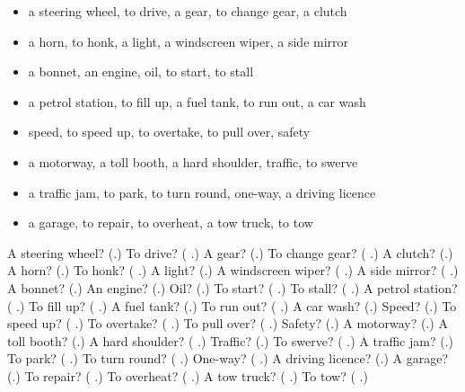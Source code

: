 \begin{itemize}
\raggedright
  \item a steering wheel, to drive, a gear, to change gear, a clutch
  \item a horn, to honk, a light, a windscreen wiper, a side mirror
  \item a bonnet, an engine, oil, to start, to stall
  \item a petrol station, to fill up, a fuel tank, to run out, a car wash
  \item speed, to speed up, to overtake, to pull over, safety
  \item a motorway, a toll booth, a hard shoulder, traffic, to swerve
  \item a traffic jam, to park, to turn round, one-way, a driving licence
  \item a garage, to repair, to overheat, a tow truck, to tow
\end{itemize}

\begin{tcolorbox}[breakable,colback=teal!4,colframe=teal!35!black,title={Before you move on}]
A steering wheel? (\textbf{}.) To drive? (\textbf{ }.) A gear? (\textbf{}.) To change gear? (\textbf{  }.) A clutch? (\textbf{}.) A horn? (\textbf{}.) To honk? (\textbf{ }.) A light? (\textbf{}.) A windscreen wiper? (\textbf{  }.) A side mirror? (\textbf{ }.) A bonnet? (\textbf{}.) An engine? (\textbf{}.) Oil? (\textbf{}.) To start? (\textbf{ }.) To stall? (\textbf{ }.) A petrol station? (\textbf{ }.) To fill up? (\textbf{ }.) A fuel tank? (\textbf{}.) To run out? (\textbf{ }.) A car wash? (\textbf{}.) Speed? (\textbf{}.) To speed up? (\textbf{ }.) To overtake? (\textbf{ }.) To pull over? (\textbf{ }.) Safety? (\textbf{}.) A motorway? (\textbf{}.) A toll booth? (\textbf{}.) A hard shoulder? (\textbf{ }.) Traffic? (\textbf{}.) To swerve? (\textbf{ }.) A traffic jam? (\textbf{}.) To park? (\textbf{ }.) To turn round? (\textbf{ }.) One-way? (\textbf{ }.) A driving licence? (\textbf{}.) A garage? (\textbf{}.) To repair? (\textbf{ }.) To overheat? (\textbf{ }.) A tow truck? (\textbf{ }.) To tow? (\textbf{ }.)
\end{tcolorbox}
